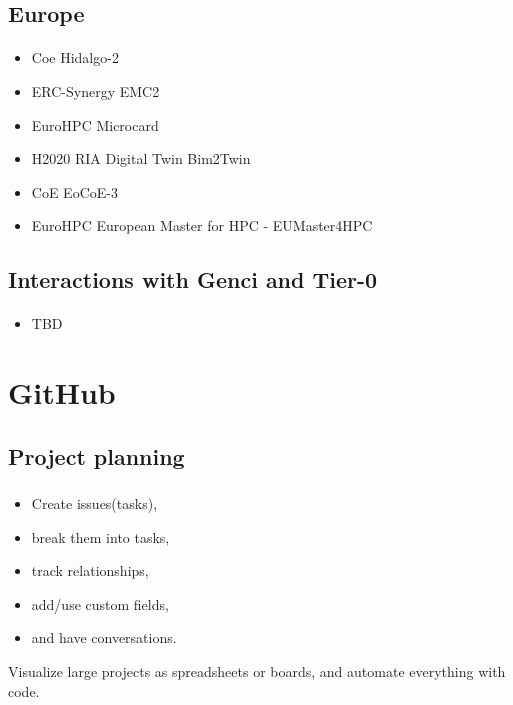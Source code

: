 \subsection{Europe}
\begin{frame}{\insertsectionhead}
  \framesubtitle{\insertsubsectionhead}
\begin{itemize}
    \item Coe Hidalgo-2 
    \item ERC-Synergy	EMC2
    \item EuroHPC	Microcard
    \item H2020 RIA Digital Twin	Bim2Twin
    \item CoE	EoCoE-3	
    \item EuroHPC	European Master for HPC - EUMaster4HPC	
\end{itemize}
\end{frame}

\subsection{Interactions with Genci and Tier-0}
\begin{frame}{\insertsectionhead}
  \framesubtitle{\insertsubsectionhead}

\begin{itemize}
    \item TBD
\end{itemize}
\end{frame}

\section{GitHub}
\subsection{Project planning}
\begin{frame}
  \frametitle{\insertsectionhead}
  \framesubtitle{\insertsubsectionhead}
  \begin{itemize}
      \item Create issues(tasks), 
      \item break them into tasks, 
      \item track relationships, 
      \item add/use custom fields, 
      \item and have conversations. 
  \end{itemize}
  \alert{Visualize large projects as spreadsheets or boards, and automate everything with code.}
\end{frame}
